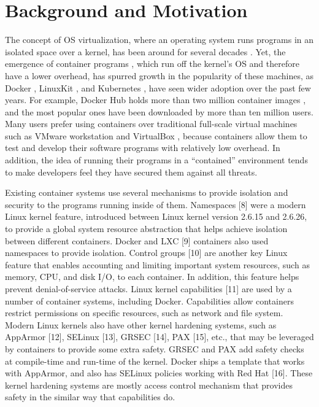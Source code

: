 \section{Background and Motivation}
\label{sec.motivation}
The concept of OS virtualization, where an operating system runs programs in an isolated space over a kernel, has been around for several decades \cite{OS-Level-Virtualization}. 
Yet,  the emergence of container programs \cite{Containers_and_VirtualMachines}, which run off the kernel's OS and therefore have a lower overhead, 
has spurred  growth in the popularity of these machines, as  Docker \cite{Docker}, LinuxKit \cite{LinuxKit}, and Kubernetes \cite{Kubernetes}, have seen wider adoption over the past few years. 
For example, Docker Hub \cite{DockerHub} holds more than two million container images , and the most popular ones have been downloaded by more than ten million users. 
Many users prefer using containers over traditional full-scale virtual machines such as VMware workstation \cite{VMWare-Workstation} and VirtualBox \cite{VirtualBox}, 
because containers allow them to test and develop their software programs with relatively low overhead. 
In addition, the idea of running their programs in a ``contained'' environment tends to make developers feel they have secured them against all threats. 

Existing container systems use several mechanisms to provide isolation and security to the programs running inside of them. 
Namespaces [8] were a modern Linux kernel feature, introduced between Linux kernel version 2.6.15 and 2.6.26, to provide a global system resource abstraction 
that helps achieve isolation between different containers. Docker and LXC [9] containers also used namespaces to provide isolation. 
Control groups [10] are another key Linux feature that enables accounting and limiting important system resources, such as memory, CPU, and disk I/O, to each container.  
In addition, this feature helps prevent denial-of-service attacks. Linux kernel capabilities [11] are used by a number of container systems, including Docker. 
Capabilities allow containers restrict permissions on specific resources, such as network and file system. 
Modern Linux kernels also have other kernel hardening systems, such as AppArmor [12], SELinux [13], GRSEC [14], PAX [15], etc., 
that may be leveraged by containers to provide some extra safety. GRSEC and PAX add safety checks at compile-time and run-time of the kernel. 
Docker ships a template that works with AppArmor, and also has SELinux policies working with Red Hat [16]. 
These kernel hardening systems are mostly access control mechanism that provides safety in the similar way that capabilities do.

